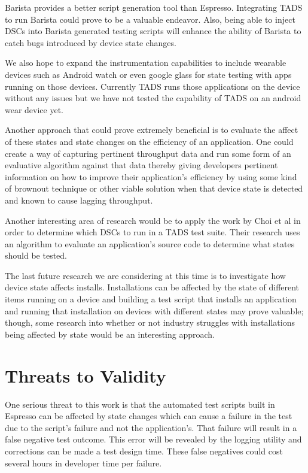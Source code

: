 Barista \cite{7927971} provides a better script generation tool than Espresso.  Integrating TADS to run Barista could prove to be a valuable endeavor. Also, being able to inject DSCs into Barista generated testing scripts will enhance the ability of Barista to catch bugs introduced by device state changes.  

We also hope to expand the instrumentation capabilities to include wearable devices such as Android watch or even google glass for state testing with apps running on those devices.  Currently TADS runs those applications on the device without any issues but we have not tested the capability of TADS on an android wear device yet.

Another approach that could prove extremely beneficial is to evaluate the affect of these states and state changes on the efficiency of an application. One could create a way of capturing pertinent throughput data and run some form of an evaluative algorithm against that data thereby giving developers pertinent information on how to improve their application's efficiency by using some kind of brownout technique \cite{Klein:2014:BBM:2568225.2568227} or other viable solution when that device state is detected and known to cause lagging throughput. 

Another interesting area of research would be to apply the work by Choi et al \cite{Choi:2013:GGT:2544173.2509552} in order to determine which DSCs to run in a TADS test suite.  Their research uses an algorithm to evaluate an application's source code to determine what states should be tested.  

The last future research we are considering at this time is to investigate how device state affects installs.  Installations can be affected by the state of different items running on a device and building a test script that installs an application and running that installation on devices with different states may prove valuable; though, some research into whether or not industry struggles with installations being affected by state would be an interesting approach.  




\section{Threats to Validity}
One serious threat to this work is that the automated test scripts built in Espresso can be affected by state changes \cite{7927971} which can cause a failure in the test due to the script's failure and not the application's.  That failure will result in a false negative test outcome.  This error will be revealed by the logging utility and corrections can be made a test design time.  These false negatives could cost several hours in developer time per failure.


